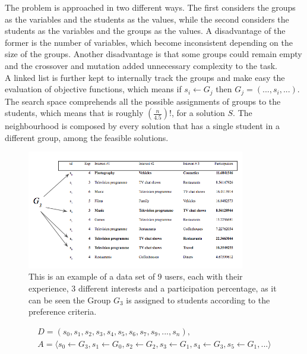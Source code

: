 The problem is approached in two different ways. The first considers the groups as the variables and the students as the values, while the second considers the students as the variables and the groups as the values. A disadvantage of the former is the number of variables, which become inconsistent depending on the size of the groups. Another disadvantage is that some groups could remain empty and the crossover and mutation added unnecessary complexity to the task.\\

A linked list is further kept to internally track the groups and make easy the evaluation of objective functions, which means if $s_i \leftarrow G_j$ then $G_j = (...,s_i,...)$.\\

The search space comprehends all the possible assignments of groups to the students, which means that is roughly $(\frac{n}{4.5})!$, for a solution $S$. The neighbourhood is composed by every solution that has a single student in a different group, among the feasible solutions.\\

\begin{figure}
    \includegraphics[width=0.85\textwidth]{images/dataset_eg.png}
    \caption{This is an example of a data set of 9 users, each with their experience, 3 different interests and a participation percentage, as it can be seen the Group $G_3$ is assigned to students according to the preference criteria.}
    \label{dataset_eg}
\end{figure}

\begin{equation}
  \label{eq:students_groups}
  \begin{gathered}
        D = (s_0,s_1,s_2,s_3,s_4,s_5,s_6,s_7,s_9,...,s_n),\\
        A = \langle s_0 \leftarrow G_3, s_1 \leftarrow G_0, s_2 \leftarrow G_2,     s_3 \leftarrow G_1, s_4 \leftarrow G_3, s_5 \leftarrow G_1,...  \rangle
  \end{gathered}
\end{equation}

